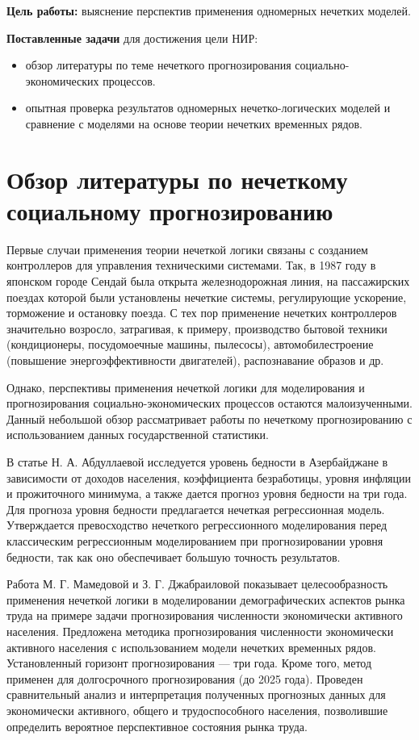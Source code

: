 \textbf{Цель работы:} выяснение перспектив применения одномерных нечетких моделей.

\textbf{Поставленные задачи} для достижения цели НИР:
\begin{itemize}
	\item обзор литературы по теме нечеткого прогнозирования социально-экономических процессов.
	\item опытная проверка результатов одномерных нечетко-логических моделей и сравнение с	моделями на основе теории нечетких временных рядов.
\end{itemize} 



\newpage
\section{Обзор литературы по нечеткому социальному прогнозированию}

Первые случаи применения теории нечеткой логики связаны с созданием контроллеров для управления техническими системами. Так, в 1987 году в японском городе Сендай была открыта железнодорожная линия, на пассажирских поездах которой были установлены нечеткие системы, регулирующие ускорение, торможение и остановку поезда. С тех пор применение нечетких контроллеров значительно возросло, затрагивая, к примеру, производство бытовой техники (кондиционеры, посудомоечные машины, пылесосы), автомобилестроение (повышение энергоэффективности двигателей), распознавание образов и др.

Однако, перспективы применения нечеткой логики для моделирования и прогнозирования социально-экономических процессов остаются малоизученными. Данный небольшой обзор рассматривает работы по нечеткому прогнозированию с использованием данных государственной статистики. 

В статье  Н. А. Абдуллаевой \cite{Abdullaeva2010} исследуется уровень бедности в Азербайджане в зависимости от доходов населения, коэффициента безработицы, уровня
инфляции и прожиточного минимума, а также дается прогноз
уровня бедности на три года. Для прогноза уровня бедности предлагается нечеткая регрессионная модель. Утверждается превосходство нечеткого регрессионного моделирования перед классическим регрессионным моделированием при прогнозировании уровня бедности, так как оно обеспечивает большую точность результатов. 

Работа М. Г. Мамедовой и З. Г. Джабраиловой \cite{Mamedova2005} 
показывает целесообразность применения нечеткой логики в моделировании демографических аспектов рынка труда на примере задачи прогнозирования численности экономически активного населения. Предложена методика прогнозирования численности экономически активного населения с
использованием модели нечетких временных рядов. Установленный горизонт прогнозирования --- три года. Кроме того, метод применен для долгосрочного прогнозирования (до 2025 года). Проведен сравнительный анализ и интерпретация полученных прогнозных данных для экономически активного, общего и трудоспособного населения, позволившие определить вероятное перспективное состояния рынка труда. 

